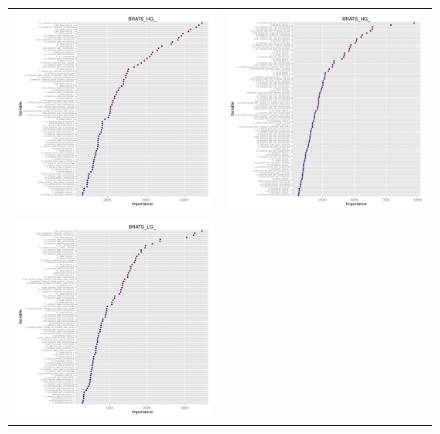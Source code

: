 \documentclass[final,5p,times,twocolumn]{elsarticle}
\begin{document}
\begin{figure}
  \centering
  \begin{tabular}{cc}
  \includegraphics[width=80mm]{Figures/BRATS_HG_GMM.pdf} &
  \includegraphics[width=80mm]{Figures/BRATS_HG_MAP_MRF.pdf} \\
  \includegraphics[width=80mm]{Figures/BRATS_LG_GMM.pdf} &

\end{tabular}
\end{figure}
\end{document}
